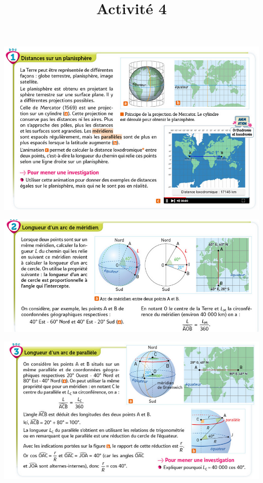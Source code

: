 \documentclass[10pt]{article}
\newcommand{\titreActivite}{Activité 4} %
\newcommand{\myscale}{0.46}
\begin{document}
\date{}
\title{\titreActivite}
\maketitle %


\begin{center}
 	\includegraphics[scale=\myscale]{assets/d1.png}

 	\includegraphics[scale=\myscale]{assets/d2.png}

    \includegraphics[scale=\myscale]{assets/d3.png}


\end{center}
\end{document}
